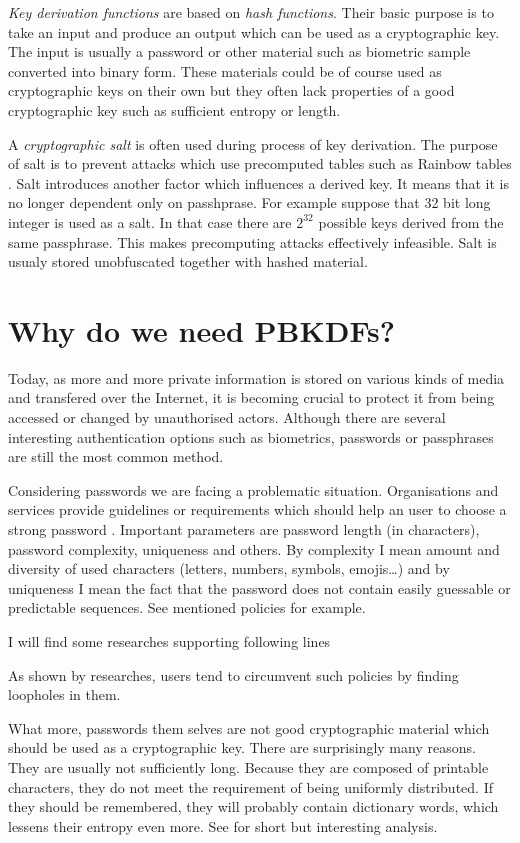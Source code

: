 \documentclass[nolof]{fithesis3}
\begin{document}
\emph{Key derivation functions} are based on \emph{hash functions}. Their basic purpose is to take an input and produce an output which can be used as a cryptographic key. The input is usually a password or other material such as biometric sample converted into binary form. These materials could be of course used as cryptographic keys on their own but they often lack properties of a good cryptographic key such as sufficient entropy or length. 

A \emph{cryptographic salt} is often used during process of key derivation. The purpose of salt is to prevent attacks which use precomputed tables such as Rainbow tables \parencite{rainbowtables}. Salt introduces another factor which influences a derived key. It means that it is no longer dependent only on passhprase. For example suppose that 32 bit long integer is used as a salt. In that case there are \(2^{32}\) possible keys derived from the same passphrase. This makes precomputing attacks effectively infeasible. Salt is usualy stored unobfuscated together with hashed material.

\section{Why do we need PBKDFs?}
\label{whypbkdfs}
Today, as more and more private information is stored on various kinds of media and transfered over the Internet, it is becoming crucial to protect it from being accessed or changed by unauthorised actors. Although there are several interesting authentication options such as biometrics, passwords or passphrases are still the most common method.

Considering passwords we are facing a problematic situation. Organisations and services provide guidelines or requirements which should help an user to choose a strong password \parencite{nistpasswords} \parencite{sanspasswordguidelines}. Important parameters are password length (in characters), password complexity, uniqueness and others. By complexity I mean amount and diversity of used characters (letters, numbers, symbols, emojis\dots) and by uniqueness I mean the fact that the password does not contain easily guessable or predictable sequences. See mentioned policies for example.

I will find some researches supporting following lines

As shown by researches, users tend to circumvent such policies by finding loopholes in them. %

What more, passwords them selves are not good cryptographic material which should be used as a cryptographic key. There are surprisingly many reasons. They are usually not sufficiently long. Because they are composed of printable characters, they do not meet the requirement of being uniformly distributed. If they should be remembered, they will probably contain dictionary words, which lessens their entropy even more. See \parencite[section 5.6.4]{itmc14} for short but interesting analysis.
\end{document}
